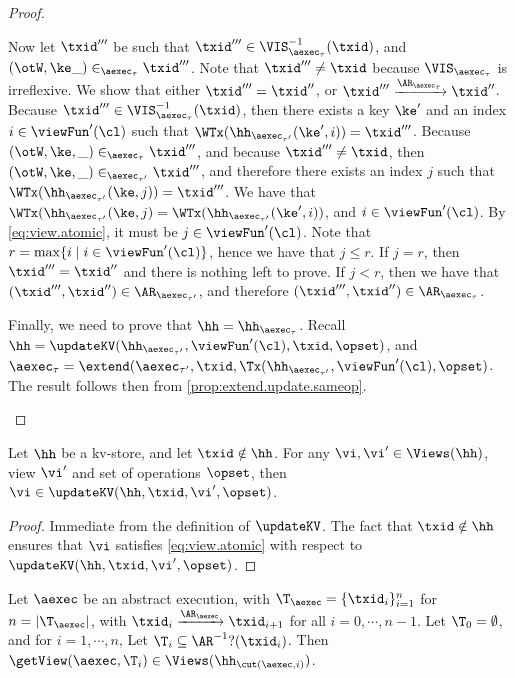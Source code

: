 \begin{proof}
\begin{itemize}
\begin{itemize}
Now let $\txid'''$ be such that $\txid''' \in \VIS^{-1}_{\aexec_{\tau}}(\txid)$, and $(\otW, \ke \_) \in_{\aexec_{\tau}} \txid'''$. 
Note that $\txid''' \neq \txid$ because $\VIS_{\aexec_{\tau}}$ is irreflexive.
We show that either $\txid''' = \txid''$, or $\txid''' \xrightarrow{\AR_{\aexec_{\tau}}} \txid''$. 
Because $\txid''' \in \VIS^{-1}_{\aexec_{\tau}}(\txid)$, then there exists a key $\ke'$ and an index $i \in \viewFun'(\cl)$ 
such that $\WTx(\hh_{\aexec_{\tau'}}(\ke', i)) = \txid'''$. Because $(\otW, \ke, \_) \in_{\aexec_{\tau}} \txid'''$, 
and because $\txid''' \neq \txid$, then $(\otW, \ke, \_) \in_{\aexec_{\tau'}} \txid'''$, and therefore there exists 
an index $j$ such that $\WTx(\hh_{\aexec_{\tau'}}(\ke, j)) = \txid'''$. We have that $\WTx(\hh_{\aexec_{\tau'}}(\ke, j) = 
\WTx(\hh_{\aexec_{\tau'}}(\ke', i))$, and $i \in \viewFun'(\cl)$. By \cref{eq:view.atomic}, it must be $j \in \viewFun'(\cl)$. 
Note that $r = \max\{i \mid i \in \viewFun'(\cl)\}$, hence we have that $j \leq r$. If $j = r$, then $\txid''' = \txid''$ and 
there is nothing left to prove. If $j < r$, then we have that $(\txid''', \txid'') \in \AR_{\aexec_{\tau'}}$, and 
therefore $(\txid''', \txid'') \in \AR_{\aexec_{\tau}}$.
\end{itemize}
Finally, we need to prove that $\hh = \hh_{\aexec_{\tau}}$.
Recall $\hh = \updateKV(\hh_{\aexec_{\tau'}}, \viewFun'(\cl), \txid, \opset)$, 
and $\aexec_{\tau} = \extend(\aexec_{\tau'}, \txid, \Tx(\hh_{\aexec_{\tau'}}, \viewFun'(\cl), \opset)$. 
The result follows then from \cref{prop:extend.update.sameop}. 
\end{itemize}
\end{proof}

\begin{lemma}
\label{lem:updatekv.preserveviews}
Let $\hh$ be a kv-store, and let $\txid \notin \hh$. For any $\vi, \vi' \in \Views(\hh)$, 
view $\vi'$ and set of operations $\opset$, then $\vi \in \updateKV(\hh, \txid, \vi', \opset)$.
\end{lemma}

\begin{proof}
Immediate from the definition of $\updateKV$. The fact that $\txid \notin \hh$ ensures that 
$\vi$ satisfies \eqref{eq:view.atomic} with respect to $\updateKV(\hh, \txid, \vi', \opset)$.
\end{proof}


\begin{lemma}
\label{lem:cut.views}
Let $\aexec$ be an abstract execution, with 
$\T_{\aexec} = \{\txid_{i}\}_{i = 1}^{n}$ for 
$n = \lvert \T_{\aexec} \rvert$, with $\txid_{i} \xrightarrow{\AR_{\aexec}} \txid_{i+1}$ 
for all $i=0,\cdots, n-1$.  Let $\T_{0} = \emptyset$, and for $i=1,\cdots, n$, Let $\T_{i} \subseteq \AR^{-1}?(\txid_{i})$. 
Then $\getView(\aexec, \T_{i}) \in \Views(\hh_{\cut(\aexec, i)})$.
\end{lemma}


